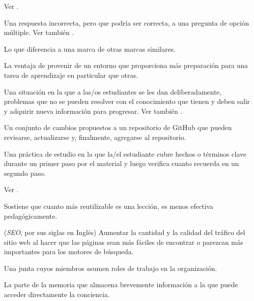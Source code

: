 \begin{description}
 Ver .


 Una respuesta incorrecta, pero que
podría ser correcta, a una pregunta de opción múltiple. Ver también
.

 Lo que diferencia a una marca de otras 
marcas similares.

 La ventaja de provenir de un entorno que proporciona más preparación para una tarea de aprendizaje en particular que otras.

 Una situación en la que a las/os estudiantes 
se les dan deliberadamente, problemas que no se pueden resolver con el conocimiento que tienen y 
deben salir y adquirir nueva información para progresar. 
Ver también .

 Un conjunto de cambios propuestos a un repositorio de 
GitHub que pueden revisarse, actualizarse y, finalmente, agregarse al repositorio.

 Una práctica de estudio 
en la que la/el estudiante cubre hechos o términos clave durante un primer paso por el material
y luego verifica cuanto recuerda en un segundo paso.

Ver .

 Sostiene que cuanto más reutilizable 
es una lección, es menos efectiva pedagógicamente.


 (\emph{SEO}, por sus siglas en Inglés)  Aumentar la cantidad y la calidad del tráfico del sitio web al hacer que las páginas sean más fáciles de encontrar o parezcan más importantes para los motores de búsqueda.

 Una junta cuyos miembros asumen roles de trabajo en la organización.

 La parte de la memoria que almacena brevemente información a la que puede acceder directamente la conciencia.



\end{description}
